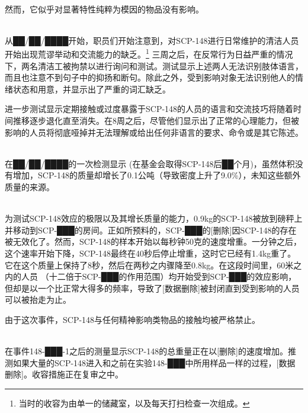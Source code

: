 \\
 然而，它似乎对显著特性纯粹为模因的物品没有影响。

\\
从██\slash ██\slash ████开始，职员们开始注意到，对SCP-148进行日常维护的清洁人员开始出现荒谬举动和交流能力的缺乏。\footnote{当时的收容为由单一的储藏室，以及每天打扫检查一次组成。} 三周之后，在反常行为日益严重的情况下，两名清洁工被拘禁以进行询问和测试。测试显示上述两人无法识别肢体语言，而且也注意不到句子中的抑扬和断句。除此之外，受到影响对象无法识别他人的情绪状态和用意，并显示出了严重的词汇缺乏。

进一步测试显示定期接触或过度暴露于SCP-148的人员的语言和交流技巧将随着时间推移逐步退化直至消失。在8周之后，尽管他们显示出了正常的心理能力，但被影响的人员将彻底哑掉并无法理解或给出任何非语言的要求、命令或是其它陈述。

\\
在██\slash ██\slash ████的一次检测显示 (在基金会取得SCP-148后██个月)，虽然体积没有增加，SCP-148的质量却增长了0.1公吨（导致密度上升了9.0\%），未知这些额外质量的来源。

\\
为测试SCP-148效应的极限以及其增长质量的能力，0.9kg的SCP-148被放到磅秤上并移动到SCP-███的房间。正如所预料的，SCP-███的{[}删除]因SCP-148的存在被无效化了。然而，SCP-148的样本开始以每秒钟50克的速度增重。一分钟之后，这个速率开始下降，SCP-148最终在40秒后停止增重，这时它已经有1.4kg重了。它在这个质量上保持了8秒，然后在两秒之内骤降至0.8kg。在这段时间里，60米之内的人员 （十二倍于SCP-███的作用范围）均开始受到SCP-███的效应影响，但却是以一个比正常大得多的频率，导致了{[}数据删除]被封闭直到受到影响的人员可以被抬走为止。

由于这次事件，SCP-148与任何精神影响类物品的接触均被严格禁止。

\\
在事件148-███-1之后的测量显示SCP-148的总重量正在以{[}删除]的速度增加。推测如果大量的SCP-148进入和之前在实验148-███中所用样品一样的过程，{[}数据删除]。收容措施正在复审之中。
